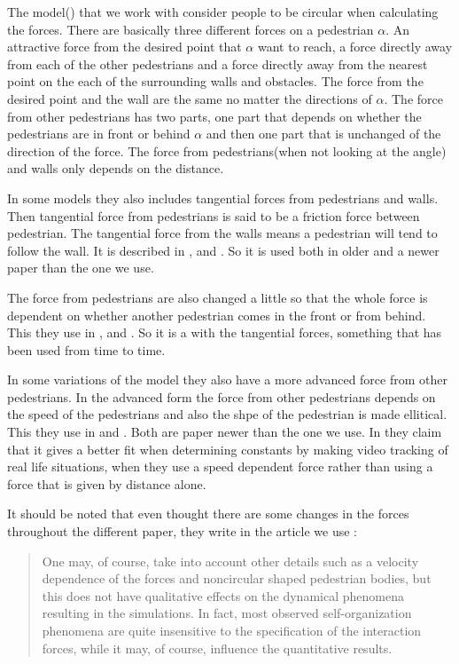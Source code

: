 The model(\cite{self-org}) that we work with consider people to be circular when calculating the forces. There are basically three different forces on a pedestrian $\alpha$. An attractive force from the desired point that $\alpha$ want to reach, a force directly away from each of the other pedestrians and a force directly away from the nearest point on the each of the surrounding  walls and obstacles. The force from the desired point and the wall are the same no matter the directions of $\alpha$. The force from other pedestrians has two parts, one part that depends on whether the pedestrians are in front or behind $\alpha$ and then one part that is unchanged of the direction of the force. The force from pedestrians(when not looking at the angle) and walls only depends on the distance. 

In some models they also includes tangential forces from pedestrians and walls. Then tangential force from pedestrians is said to be a friction force between pedestrian. The tangential force from the walls means a pedestrian will tend to follow the wall. It is described in \cite{helbing00},  and \cite{HelbingNew}. So it is used both in older and a newer paper than the one we use.

The force from pedestrians are also changed a little so that the whole force is dependent on whether another pedestrian comes in the front or from behind. This they use in \cite{ABconstant}, \cite{HelbingNew} and  \cite{helbing00}. So it is a with the tangential forces, something that has been used from time to time. 

In some variations of the model they also have a more advanced force from other pedestrians. In the advanced form the force from other pedestrians depends on the speed of the pedestrians and also the shpe of the pedestrian is made ellitical. This they use in \cite{HelbingNew} and \cite{ABconstant}.  Both are paper newer than the one we use. In \cite{ABconstant} they claim that it gives a better fit when determining constants by making video tracking of real life situations, when they use a speed dependent force rather than using a force that is given by distance alone. 



It should be noted that even thought there are some changes in the forces throughout the different paper, they write in the article we use \cite{self-org}:
\begin{quote}
 One may, of
course, take into account other details such as a velocity
dependence of the forces and noncircular shaped
pedestrian bodies, but this does not have qualitative
effects on the dynamical phenomena resulting in the
simulations. In fact, most observed self-organization
phenomena are quite insensitive to the specification
of the interaction forces, while it may, of course, influence
the quantitative results.
\end{quote}

